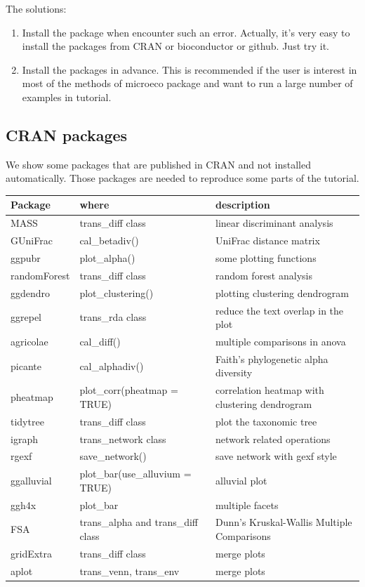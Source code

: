 \documentclass[
]{book}
\begin{document}
The solutions:

\begin{enumerate}
\def\labelenumi{\arabic{enumi}.}
\item
  Install the package when encounter such an error. Actually, it's very easy to install the packages from CRAN or bioconductor or github. Just try it.
\item
  Install the packages in advance. This is recommended if the user is interest in most of the methods of microeco package and want to run a large number of examples in tutorial.
\end{enumerate}

\hypertarget{cran-packages}{%
\subsection{CRAN packages}\label{cran-packages}}

We show some packages that are published in CRAN and not installed automatically.
Those packages are needed to reproduce some parts of the tutorial.

\begin{tabular}{l|l|l}
\hline
Package & where & description\\
\hline
MASS & trans\_diff class & linear discriminant analysis\\
\hline
GUniFrac & cal\_betadiv() & UniFrac distance matrix\\
\hline
ggpubr & plot\_alpha() & some plotting functions\\
\hline
randomForest & trans\_diff class & random forest analysis\\
\hline
ggdendro & plot\_clustering() & plotting clustering dendrogram\\
\hline
ggrepel & trans\_rda class & reduce the text overlap in the plot\\
\hline
agricolae & cal\_diff() & multiple comparisons in anova\\
\hline
picante & cal\_alphadiv() & Faith’s phylogenetic alpha diversity\\
\hline
pheatmap & plot\_corr(pheatmap = TRUE) & correlation heatmap with clustering dendrogram\\
\hline
tidytree & trans\_diff class & plot the taxonomic tree\\
\hline
igraph & trans\_network class & network related operations\\
\hline
rgexf & save\_network() & save network with gexf style\\
\hline
ggalluvial & plot\_bar(use\_alluvium = TRUE) & alluvial plot\\
\hline
ggh4x & plot\_bar & multiple facets\\
\hline
FSA & trans\_alpha and trans\_diff class & Dunn's Kruskal-Wallis Multiple Comparisons\\
\hline
gridExtra & trans\_diff class & merge plots\\
\hline
aplot & trans\_venn, trans\_env & merge plots\\
\hline
\end{tabular}
\end{document}

